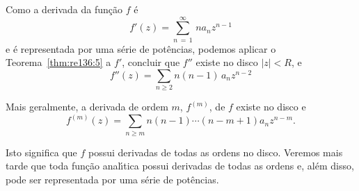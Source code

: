 Como a derivada da  fun\c{c}\~{a}o $f$ \'{e}
\begin{equation*}
  f'(z)= \sum_{n\,=\, 1}^{\infty}\, na_nz^{n-1}
\end{equation*}
e \'{e} representada por uma s\'{e}rie de pot\^{e}ncias, podemos aplicar o
Teorema~\ref{thm:re136:5} a $f'$, concluir que $f''$ existe no disco
$|z|<R$, e
\begin{equation*}
  f''(z)=\sum_{n\geq 2}n(n-1)\,a_{n}z^{n-2}
\end{equation*}

Mais geralmente, a derivada de ordem $m$, $f^{(m)}$, de $f$ existe
no disco e
\begin{equation}\label{funre136:11}
f^{(m)}(z)=\sum_{n\geq m} n(n - 1)\cdots(n - m + 1)a_nz^{n-m}.
\end{equation}

Isto significa que $f$ possui derivadas de todas as ordens no
disco. Veremos mais tarde  que toda fun\c{c}\~{a}o anal\'{\i}tica possui
derivadas de todas as ordens e, al\'{e}m disso, pode ser representada
por uma s\'{e}rie de pot\^{e}ncias.


